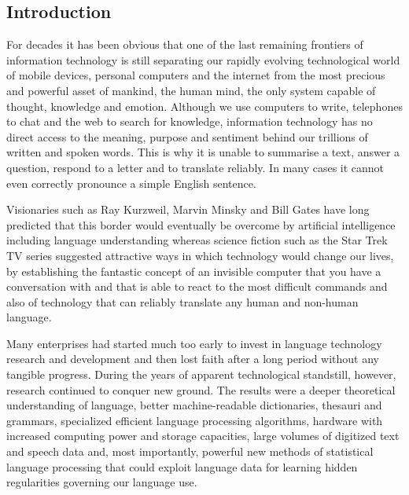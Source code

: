 \documentclass[10pt, plain]{../../metanetpaper}
\begin{document}


\label{sec:pts}


\begin{multicols}{2}
\subsection{Introduction}
\label{sec:pt-introduction}

For decades it has been obvious that one of the last remaining frontiers of information technology is still
separating our rapidly evolving technological world of mobile devices, personal computers and the internet from the most precious and powerful asset of mankind, the human mind, the only system capable of thought, knowledge and emotion. Although we use computers to write, telephones to chat and the web to search for knowledge, information technology has no direct access to the meaning, purpose and sentiment behind our trillions of written and spoken words. This is why it is unable to summarise a text, answer a question, respond to a letter and to translate reliably. In many cases it cannot even correctly pronounce a simple English sentence.

Visionaries such as Ray Kurzweil, Marvin Minsky and Bill Gates have long predicted that this border would eventually be overcome by artificial intelligence including language understanding whereas science fiction such as the Star Trek TV series suggested attractive ways in which technology would change our lives, by establishing the fantastic concept of an invisible computer that you have a conversation with and that is able to react to the most difficult commands and also of technology that can reliably translate any human and non-human language.

Many enterprises had started much too early to invest in language technology research and development and then lost faith after a long period without any tangible progress. During the years of apparent technological standstill, however, research continued to conquer new ground. The results were a deeper theoretical understanding of language, better machine-readable dictionaries, thesauri and grammars, specialized efficient language processing algorithms, hardware with increased computing power and storage capacities, large volumes of digitized text and speech data and, most importantly, powerful new methods of statistical language processing that could exploit language data for learning hidden regularities governing our language use.


\end{multicols}
\end{document}
